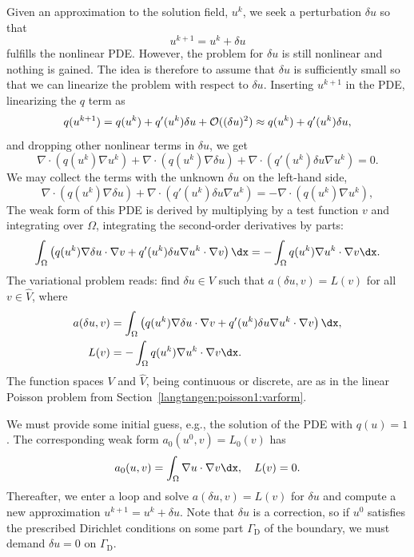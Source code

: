 Given an approximation to the solution field, $u^k$, we seek a
perturbation $\delta u$ so that
\begin{equation}
u^{k+1} = u^k + \delta u
\end{equation}
fulfills the nonlinear PDE.
However, the problem for $\delta u$ is still nonlinear and nothing is
gained. The idea is therefore to assume that $\delta u$ is sufficiently
small so that we can linearize the problem with respect to $\delta u$.
Inserting $u^{k+1}$ in the PDE,
linearizing the $q$ term as
\begin{equation}
q(u^{k+1}) = q(u^k) + q'(u^k)\delta u + {\cal O}((\delta u)^2)
\approx q(u^k) + q'(u^k)\delta u,
\end{equation}
and dropping other nonlinear terms in $\delta u$,
we get
\[
\nabla\cdot\left( q(u^k)\nabla u^k\right) +
\nabla\cdot\left( q(u^k)\nabla\delta u\right) +
\nabla\cdot\left( q'(u^k)\delta u\nabla u^k\right) = 0.
\]
We may collect the terms with the unknown $\delta u$ on the left-hand side,
\begin{equation}
\nabla\cdot\left( q(u^k)\nabla\delta u\right) +
\nabla\cdot\left( q'(u^k)\delta u\nabla u^k\right) =
-\nabla\cdot\left( q(u^k)\nabla u^k\right),
\end{equation}
The weak form of this PDE is derived by multiplying by a test function $v$
and integrating over $\Omega$, integrating the second-order derivatives
by parts:
\begin{equation}
\int_\Omega \left(
q(u^k)\nabla\delta u\cdot \nabla v
+ q'(u^k)\delta u\nabla u^k\cdot \nabla v\right)\dx
= -\int_\Omega q(u^k)\nabla u^k\cdot \nabla v\dx.
\end{equation}
The variational problem reads: find $\delta u\in V$ such that
$a(\delta u,v) = L(v)$ for all $v\in \hat V$, where
\begin{align}
a(\delta u,v) &= \int_\Omega \left( q(u^k)\nabla\delta u\cdot \nabla v
+ q'(u^k)\delta u\nabla u^k\cdot \nabla v\right)\dx,
\label{langtangen:nonlinear:poisson:pdelevel:eqa}
\\
L(v) &= - \int_\Omega q(u^k)\nabla u^k\cdot \nabla v\dx.
\label{langtangen:nonlinear:poisson:pdelevel:eqL}
\end{align}
The function spaces $V$ and $\hat V$, being continuous
or discrete, are as in the linear Poisson problem from
Section~\ref{langtangen:poisson1:varform}.

We must provide some initial guess, e.g., the solution of the
PDE with $q(u)=1$. The corresponding weak form $a_0(u^0,v)=L_0(v)$
has
\begin{equation}
a_0(u,v)=\int_\Omega\nabla u\cdot \nabla v\dx,\quad
L(v)=0.
\end{equation}
Thereafter, we enter a loop and solve $a(\delta u,v)=L(v)$ for $\delta
u$ and compute a new approximation $u^{k+1} = u^k + \delta u$. Note
that $\delta u$ is a correction, so if $u^0$ satisfies the prescribed
Dirichlet conditions on some part $\Gamma_{\mathrm{D}}$ of the boundary, we must
demand $\delta u=0$ on $\Gamma_{\mathrm{D}}$.

